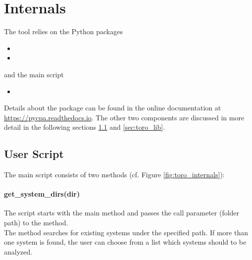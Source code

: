 \section{Internals}
\label{sec:internals}
The tool \Tool relies on the Python packages
\begin{itemize}[itemsep=0pt]
	\item {}
	\item {}
\end{itemize}
and the main script
\begin{itemize}[itemsep=0pt]
	\item {}
\end{itemize}
Details about the  package can be found in the online documentation at \url{https://pycpa.readthedocs.io}.
The other two components are discussed in more detail in the following sections \ref{sec:script} and \ref{sec:toro_lib}.
    
\subsection{User Script}
\label{sec:script}
The main script  consists of two methods (cf. Figure \ref{fig:toro_internals}):

\paragraph{get\_system\_dirs(dir)}
The script  starts with the main method and passes the call parameter (folder path) to the  method. \\
The method  searches for existing systems under the specified path. 
If more than one system is found, the user can choose from a list which systems should to be analyzed. 

